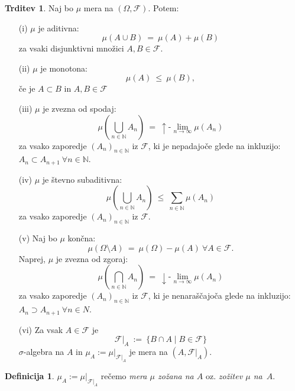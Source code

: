 \documentclass[11pt]{article}
\newcommand{\N}{\mathbb{N}}
\newcommand{\F}{\mathcal{F}}
\newcommand{\set}[1]{\{#1\}}
\newcommand{\oklepaj}[1]{\left(#1\right)}
\theoremstyle{definition}
\newtheorem{definicija}{Definicija}[section]
\theoremstyle{definition}
\newtheorem{trditev}{Trditev}[section]
\theoremstyle{definition}
\theoremstyle{definition}
\begin{document}
\begin{trditev}

Naj bo $\mu$ mera na $(\Omega, \F)$. Potem:
\begin{enumerate}

\item[(i)] $\mu$ je aditivna: 
$$\mu(A \cup B) ~=~ \mu(A) + \mu(B)$$
za vsaki disjunktivni množici $A,B \in \F$.

\item[(ii)] $\mu$ je monotona:
$$\mu(A) ~\leq~ \mu(B),$$
če je $A \subset B$ in $A,B \in \F$

\item[(iii)] $\mu$ je zvezna od spodaj:
$$\mu\oklepaj{\bigcup_{n \in \N} A_n} ~=~ {\uparrow\text{-}\lim_{n \rightarrow \infty}} \mu(A_n)$$
za vsako zaporedje $(A_n)_{n \in \N}$ iz $\F$, ki je nepadajoče glede na inkluzijo: $A_n \subset A_{n+1} ~\forall n \in \N$.

\item[(iv)] $\mu$ je števno subaditivna:
$$\mu\oklepaj{\bigcup_{n \in \N} A_n} ~\leq~ \sum_{n \in \N} \mu(A_n)$$
za vsako zaporedje $(A_n)_{n \in \N}$ iz $\F$.

\item[(v)] Naj bo $\mu$ končna:
$$\mu(\Omega \setminus A) ~=~ \mu(\Omega) - \mu(A) ~\forall A \in \F.$$
Naprej, $\mu$ je zvezna od zgoraj:
$$\mu\oklepaj{\bigcap_{n \in \N} A_n} ~=~ {\downarrow\text{-}\lim_{n \rightarrow \infty}}\mu(A_n)$$
za vsako zaporedje $(A_n)_{n \in \N}$ iz $\F$, ki je nenaraščajoča glede na inkluzijo: $A_n \supset A_{n+1} ~\forall n \in N$.

\item[(vi)] Za vsak $A \in \F$ je
$$\F \big|_A ~:=~ \set{B \cap A \mid B \in \F}$$
$\sigma$-algebra na $A$ in $\mu_A := \mu\big|_{\F\big|_A}$ je mera na $(A, \F\big|_A)$. 

\end{enumerate}

\end{trditev}
\vspace{0.5cm}

\begin{definicija}

$\mu_A := \mu\big|_{\F\big|_A}$ rečemo \textit{mera $\mu$ zožana na $A$} oz. \textit{zožitev $\mu$ \hbox{na $A$}}.

\end{definicija}
\vspace{0.5cm}

\end{document}
